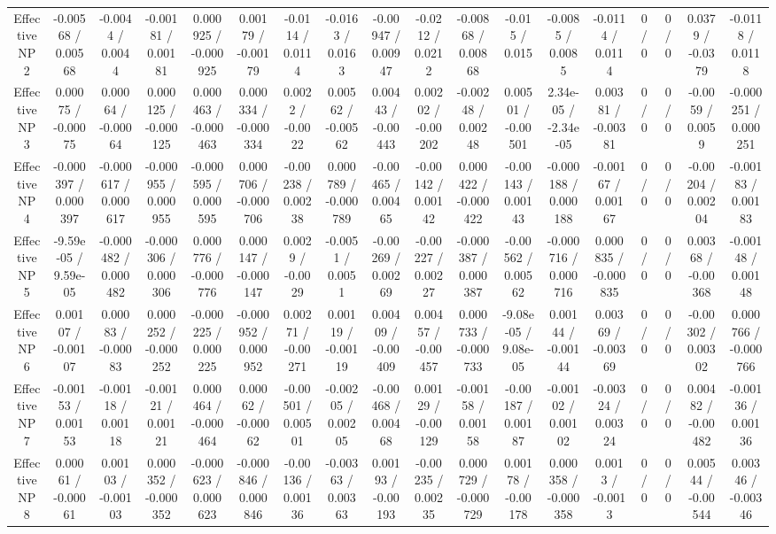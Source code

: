 \documentclass[10pt]{article}
\begin{document}
\begin{table}[htbp]
\begin{center}
\begin{tabular}{|c|c|c|c|c|c|c|c|c|c|c|c|c|c|c|c|c|c|}
  Effective NP 2 & -0.00568 / 0.00568 & -0.0044 / 0.0044 & -0.00181 / 0.00181 & 0.000925 / -0.000925 & 0.00179 / -0.00179 & -0.0114 / 0.0114 & -0.0163 / 0.0163 & -0.00947 / 0.00947 & -0.0212 / 0.0212 & -0.00868 / 0.00868 & -0.015 / 0.015 & -0.0085 / 0.0085 & -0.0114 / 0.0114 & 0 / 0 & 0 / 0 & 0.0379 / -0.0379 & -0.0118 / 0.0118 \\ 
  Effective NP 3 & 0.00075 / -0.00075 & 0.00064 / -0.00064 & 0.000125 / -0.000125 & 0.000463 / -0.000463 & 0.000334 / -0.000334 & 0.0022 / -0.0022 & 0.00562 / -0.00562 & 0.00443 / -0.00443 & 0.00202 / -0.00202 & -0.00248 / 0.00248 & 0.00501 / -0.00501 & 2.34e-05 / -2.34e-05 & 0.00381 / -0.00381 & 0 / 0 & 0 / 0 & -0.0059 / 0.0059 & -0.000251 / 0.000251 \\ 
  Effective NP 4 & -0.000397 / 0.000397 & -0.000617 / 0.000617 & -0.000955 / 0.000955 & -0.000595 / 0.000595 & 0.000706 / -0.000706 & -0.00238 / 0.00238 & 0.000789 / -0.000789 & -0.00465 / 0.00465 & -0.00142 / 0.00142 & 0.000422 / -0.000422 & -0.00143 / 0.00143 & -0.000188 / 0.000188 & -0.00167 / 0.00167 & 0 / 0 & 0 / 0 & -0.00204 / 0.00204 & -0.00183 / 0.00183 \\ 
  Effective NP 5 & -9.59e-05 / 9.59e-05 & -0.000482 / 0.000482 & -0.000306 / 0.000306 & 0.000776 / -0.000776 & 0.000147 / -0.000147 & 0.0029 / -0.0029 & -0.0051 / 0.0051 & -0.00269 / 0.00269 & -0.00227 / 0.00227 & -0.000387 / 0.000387 & -0.00562 / 0.00562 & -0.000716 / 0.000716 & 0.000835 / -0.000835 & 0 / 0 & 0 / 0 & 0.00368 / -0.00368 & -0.00148 / 0.00148 \\ 
  Effective NP 6 & 0.00107 / -0.00107 & 0.00083 / -0.00083 & 0.000252 / -0.000252 & -0.000225 / 0.000225 & -0.000952 / 0.000952 & 0.00271 / -0.00271 & 0.00119 / -0.00119 & 0.00409 / -0.00409 & 0.00457 / -0.00457 & 0.000733 / -0.000733 & -9.08e-05 / 9.08e-05 & 0.00144 / -0.00144 & 0.00369 / -0.00369 & 0 / 0 & 0 / 0 & -0.00302 / 0.00302 & 0.000766 / -0.000766 \\ 
  Effective NP 7 & -0.00153 / 0.00153 & -0.00118 / 0.00118 & -0.00121 / 0.00121 & 0.000464 / -0.000464 & 0.00062 / -0.00062 & -0.00501 / 0.00501 & -0.00205 / 0.00205 & -0.00468 / 0.00468 & 0.00129 / -0.00129 & -0.00158 / 0.00158 & -0.00187 / 0.00187 & -0.00102 / 0.00102 & -0.00324 / 0.00324 & 0 / 0 & 0 / 0 & 0.00482 / -0.00482 & -0.00136 / 0.00136 \\ 
  Effective NP 8 & 0.00061 / -0.00061 & 0.00103 / -0.00103 & 0.000352 / -0.000352 & -0.000623 / 0.000623 & -0.000846 / 0.000846 & -0.00136 / 0.00136 & -0.00363 / 0.00363 & 0.00193 / -0.00193 & -0.00235 / 0.00235 & 0.000729 / -0.000729 & 0.00178 / -0.00178 & 0.000358 / -0.000358 & 0.0013 / -0.0013 & 0 / 0 & 0 / 0 & 0.00544 / -0.00544 & 0.00346 / -0.00346 \\ 

\end{tabular}
\end{center}
\end{table}
\end{document}
